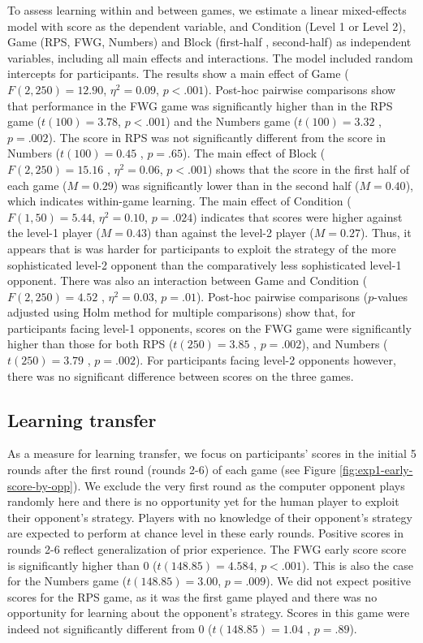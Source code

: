 \documentclass[smallextended]{svjour3}       %
\begin{document}
To assess learning within and between games, we estimate a linear
mixed-effects model with score as the dependent variable, and Condition
(Level 1 or Level 2), Game (RPS, FWG, Numbers) and Block (first-half ,
second-half) as independent variables, including all main effects and
interactions. The model included random intercepts for participants. The
results show a main effect of Game (\(F(2,250) = 12.90\),
\(\eta^{2} = 0.09\), \(p < .001\)). Post-hoc pairwise comparisons show
that performance in the FWG game was significantly higher than in the
RPS game (\(t(100) =3.78\), \(p < .001\)) and the Numbers game
(\(t(100) = 3.32\) , \(p = .002\)). The score in RPS was not
significantly different from the score in Numbers (\(t(100) = 0.45\) ,
\(p = .65\)). The main effect of Block (\(F(2,250) = 15.16\) ,
\(\eta^{2} = 0.06\), \(p < .001\)) shows that the score in the first
half of each game (\(M = 0.29\)) was significantly lower than in the
second half (\(M = 0.40\)), which indicates within-game learning. The
main effect of Condition (\(F(1,50) = 5.44\), \(\eta^{2} = 0.10\),
\(p = .024\)) indicates that scores were higher against the level-1
player (\(M = 0.43\)) than against the level-2 player (\(M = 0.27\)).
Thus, it appears that is was harder for participants to exploit the
strategy of the more sophisticated level-2 opponent than the
comparatively less sophisticated level-1 opponent. There was also an
interaction between Game and Condition (\(F(2,250) = 4.52\) ,
\(\eta^{2} = 0.03\), \(p = .01\)). Post-hoc pairwise comparisons
(\(p\)-values adjusted using Holm method for multiple comparisons) show
that, for participants facing level-1 opponents, scores on the FWG game
were significantly higher than those for both RPS (\(t(250) = 3.85\) ,
\(p = .002\)), and Numbers (\(t(250) = 3.79\) , \(p = .002\)). For
participants facing level-2 opponents however, there was no significant
difference between scores on the three games.

\hypertarget{learning-transfer}{%
\subsection{Learning transfer}\label{learning-transfer}}

As a measure for learning transfer, we focus on participants' scores in
the initial 5 rounds after the first round (rounds 2-6) of each game
(see Figure \ref{fig:exp1-early-score-by-opp}). We exclude the very
first round as the computer opponent plays randomly here and there is no
opportunity yet for the human player to exploit their opponent's
strategy. Players with no knowledge of their opponent's strategy are
expected to perform at chance level in these early rounds. Positive
scores in rounds 2-6 reflect generalization of prior experience. The FWG
early score score is significantly higher than 0 (\(t(148.85) = 4.584\),
\(p < .001\)). This is also the case for the Numbers game
(\(t(148.85) = 3.00\), \(p = .009\)). We did not expect positive scores
for the RPS game, as it was the first game played and there was no
opportunity for learning about the opponent's strategy. Scores in this
game were indeed not significantly different from 0
(\(t(148.85) = 1.04\) , \(p = .89\)).
\end{document}
